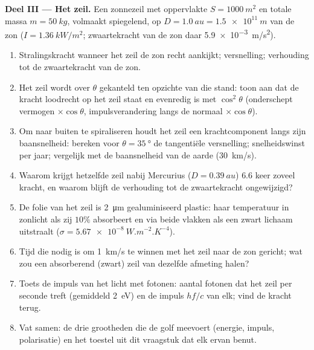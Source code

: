\begin{problem}
\medskip
\noindent\textbf{Deel III --- Het zeil.}
Een zonnezeil met oppervlakte $S = \qty{1000}{m^2}$ en totale massa
$m = \qty{50}{kg}$, volmaakt spiegelend, op
$D = \qty{1.0}{au} = \qty{1.5e11}{m}$ van de zon ($I = \qty{1.36}{kW/m^2}$;
zwaartekracht van de zon daar \qty{5.9e-3}{m/s^2}).
\begin{enumerate}[resume]
  \item Stralingskracht wanneer het zeil de zon recht aankijkt; versnelling;
        verhouding tot de zwaartekracht van de zon.
  \item Het zeil wordt over $\theta$ gekanteld ten opzichte van die stand:
        toon aan dat de kracht loodrecht op het zeil staat en evenredig is
        met $\cos^2\theta$ (onderschept vermogen $\times\cos\theta$,
        impulsverandering langs de normaal $\times\cos\theta$).
  \item Om naar buiten te spiraliseren houdt het zeil een krachtcomponent
        langs zijn baansnelheid: bereken voor $\theta = \qty{35}{\degree}$
        de tangentiële versnelling; snelheidswinst per jaar; vergelijk met
        de baansnelheid van de aarde (\qty{30}{km/s}).
  \item Waarom krijgt hetzelfde zeil nabij Mercurius ($D = \qty{0.39}{au}$)
        $6.6$ keer zoveel kracht, en waarom blijft de verhouding tot de
        zwaartekracht ongewijzigd?
  \item De folie van het zeil is \qty{2}{\micro m} geal\-u\-mi\-ni\-seerd
        plastic: haar temperatuur in zonlicht als zij $10\%$ absorbeert en
        via beide vlakken als een zwart lichaam uitstraalt
        ($\sigma = \qty{5.67e-8}{W.m^{-2}.K^{-4}}$).
  \item Tijd die nodig is om \qty{1}{km/s} te winnen met het zeil naar de
        zon gericht; wat zou een absorberend (zwart) zeil van dezelfde
        afmeting halen?
  \item Toets de impuls van het licht met fotonen: aantal fotonen dat het
        zeil per seconde treft (gemiddeld \qty{2}{eV}) en de impuls $hf/c$
        van elk; vind de kracht terug.
  \item Vat samen: de drie grootheden die de golf meevoert (energie, impuls,
        polarisatie) en het toestel uit dit vraagstuk dat elk ervan benut.
\end{enumerate}
\end{problem}
